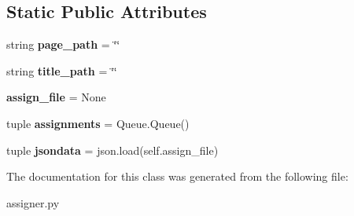 \subsection*{Static Public Attributes}
\begin{DoxyCompactItemize}
\item 
\hypertarget{classbookcrawl_1_1assigner_1_1BookAssigner_ad9cfd3fde6448963e11ddc39613fe49e}{}string {\bfseries page\+\_\+path} = \char`\"{}\char`\"{}\label{classbookcrawl_1_1assigner_1_1BookAssigner_ad9cfd3fde6448963e11ddc39613fe49e}

\item 
\hypertarget{classbookcrawl_1_1assigner_1_1BookAssigner_a92af68d62f50eac5f4a844b137ae81a9}{}string {\bfseries title\+\_\+path} = \char`\"{}\char`\"{}\label{classbookcrawl_1_1assigner_1_1BookAssigner_a92af68d62f50eac5f4a844b137ae81a9}

\item 
\hypertarget{classbookcrawl_1_1assigner_1_1BookAssigner_ab7c26a5e57783fedebe46ec0629dcbf7}{}{\bfseries assign\+\_\+file} = None\label{classbookcrawl_1_1assigner_1_1BookAssigner_ab7c26a5e57783fedebe46ec0629dcbf7}

\item 
\hypertarget{classbookcrawl_1_1assigner_1_1BookAssigner_a110393458b3363cead5e74d3dd46b36b}{}tuple {\bfseries assignments} = Queue.\+Queue()\label{classbookcrawl_1_1assigner_1_1BookAssigner_a110393458b3363cead5e74d3dd46b36b}

\item 
\hypertarget{classbookcrawl_1_1assigner_1_1BookAssigner_a05cb03e8f88c29921d50eb2f5b30bde6}{}tuple {\bfseries jsondata} = json.\+load(self.\+assign\+\_\+file)\label{classbookcrawl_1_1assigner_1_1BookAssigner_a05cb03e8f88c29921d50eb2f5b30bde6}

\end{DoxyCompactItemize}


The documentation for this class was generated from the following file\+:\begin{DoxyCompactItemize}
\item 
assigner.\+py\end{DoxyCompactItemize}
